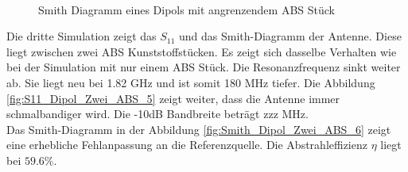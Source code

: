 \begin{figure}[!ht]
\begin{center}
  \caption{\\Smith Diagramm eines Dipols mit angrenzendem ABS Stück}\label{fig:Smith_Dipol_ABS_4}
\endminipage
\end{center}
\end{figure}

\newpage
Die dritte Simulation zeigt das $S_{11}$ und das Smith-Diagramm der Antenne. Diese liegt zwischen zwei ABS Kunststoffstücken. Es zeigt sich dasselbe Verhalten wie bei der Simulation mit nur einem ABS Stück. Die Resonanzfrequenz sinkt weiter ab. Sie liegt neu bei 1.82 GHz und ist somit 180 MHz tiefer. Die Abbildung  \ref{fig:S11_Dipol_Zwei_ABS_5} zeigt weiter, dass die Antenne immer schmalbandiger wird. Die -10dB Bandbreite beträgt zzz MHz.\\
Das Smith-Diagramm in der Abbildung \ref{fig:Smith_Dipol_Zwei_ABS_6} zeigt eine erhebliche Fehlanpassung an die Referenzquelle. Die Abstrahleffizienz $\eta$ liegt  bei $59.6 \%$.

